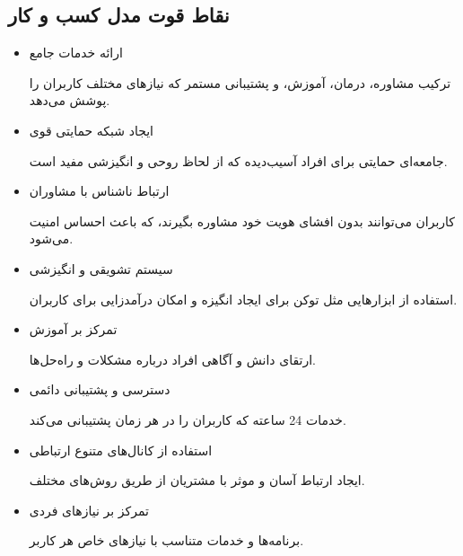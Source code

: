 \documentclass[dvipsnames, svgnames, x11names, 11pt]{article}
\begin{document}
\subsection{نقاط قوت مدل کسب و کار}
\begin{itemize}
\item 
ارائه خدمات جامع

ترکیب مشاوره، درمان، آموزش، و پشتیبانی مستمر که نیازهای مختلف کاربران را پوشش می‌دهد.

\item 
ایجاد شبکه حمایتی قوی

جامعه‌ای حمایتی برای افراد آسیب‌دیده که از لحاظ روحی و انگیزشی مفید است.

\item 
ارتباط ناشناس با مشاوران

کاربران می‌توانند بدون افشای هویت خود مشاوره بگیرند، که باعث احساس امنیت می‌شود.

\item 
سیستم تشویقی و انگیزشی

استفاده از ابزارهایی مثل توکن برای ایجاد انگیزه و امکان درآمدزایی برای کاربران.

\item 
تمرکز بر آموزش

ارتقای دانش و آگاهی افراد درباره مشکلات و راه‌حل‌ها.

\item 
دسترسی و پشتیبانی دائمی

خدمات 24 ساعته که کاربران را در هر زمان پشتیبانی می‌کند.

\item 
استفاده از کانال‌های متنوع ارتباطی

ایجاد ارتباط آسان و موثر با مشتریان از طریق روش‌های مختلف.

\item 
تمرکز بر نیازهای فردی

برنامه‌ها و خدمات متناسب با نیازهای خاص هر کاربر.
\end{itemize}
\end{document}

